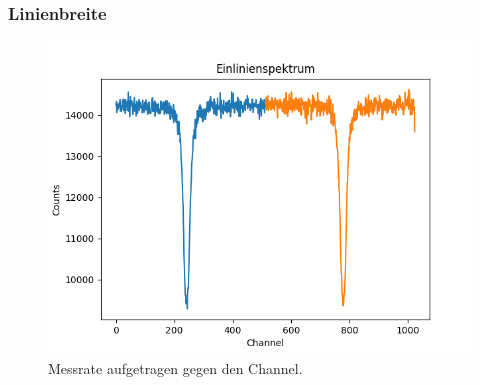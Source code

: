 \documentclass[12pt,a4paper]{article}
\begin{document}
\subsubsection{Linienbreite}
\begin{figure}
\centering
\includegraphics[scale=0.8]{Bilder/Einlinien/Ein_Rohdaten.png}
\caption{Messrate aufgetragen gegen den Channel.}
\label{fig:Ein_Roh}
\end{figure}
\end{document}
